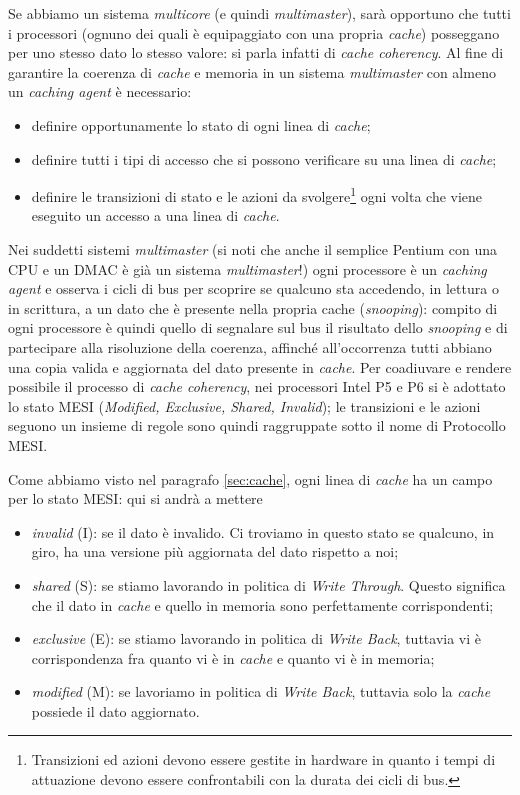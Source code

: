 Se abbiamo un sistema \textit{multicore} (e quindi \textit{multimaster}), sarà opportuno che tutti i processori (ognuno dei quali è equipaggiato con una propria \textit{cache}) posseggano per uno stesso dato lo stesso valore: si parla infatti di \textit{cache coherency}. Al fine di garantire la coerenza di \textit{cache} e memoria in un sistema \textit{multimaster} con almeno un \textit{caching agent} è necessario:
\begin{itemize}
\item  definire opportunamente lo stato di ogni linea di \textit{cache};
\item  definire tutti i tipi di accesso che si possono verificare su una linea di \textit{cache};
\item  definire le transizioni di stato e le azioni da svolgere\footnote{Transizioni ed azioni devono essere gestite in hardware in quanto i tempi di attuazione devono essere confrontabili con la durata dei cicli di bus.} ogni volta che viene eseguito un accesso a una linea di \textit{cache}.
\end{itemize}
Nei suddetti sistemi \textit{multimaster} (si noti che anche il semplice Pentium con una CPU e un DMAC è già un sistema \textit{multimaster}!) ogni processore è un \textit{caching agent} e osserva i cicli di bus per scoprire se qualcuno sta accedendo, in lettura o in scrittura, a un dato che è presente nella propria cache (\textit{snooping}): compito di ogni processore è quindi quello di segnalare sul bus il risultato dello \textit{snooping} e di partecipare alla risoluzione della coerenza, affinché all'occorrenza tutti abbiano una copia valida e aggiornata del dato presente in \textit{cache}.
Per coadiuvare e rendere possibile il processo di \textit{cache coherency}, nei processori Intel P5 e P6 si è adottato lo stato MESI (\textit{Modified, Exclusive, Shared, Invalid}); le transizioni e le azioni seguono un insieme di regole sono quindi raggruppate sotto il nome di Protocollo MESI. 

Come abbiamo visto nel paragrafo \ref{sec:cache}, ogni linea di \textit{cache} ha un campo per lo stato MESI: qui si andrà a mettere
\begin{itemize}
\item \textit{invalid} (I): se il dato è invalido. Ci troviamo in questo stato se qualcuno, in giro, ha una versione più aggiornata del dato rispetto a noi;
\item \textit{shared} (S): se stiamo lavorando in politica di \textit{Write Through}. Questo significa che il dato in \textit{cache} e quello in memoria sono perfettamente corrispondenti;
\item \textit{exclusive} (E): se stiamo lavorando in politica di \textit{Write Back}, tuttavia vi è corrispondenza fra quanto vi è in \textit{cache} e quanto vi è in memoria;
\item \textit{modified} (M): se lavoriamo in politica di \textit{Write Back}, tuttavia solo la \textit{cache} possiede il dato aggiornato.
\end{itemize}

